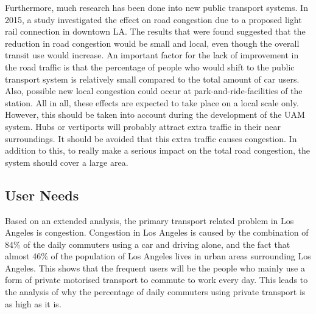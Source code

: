 Furthermore, much research has been done into new public transport systems. In 2015, a study \cite{lightrail} investigated the effect on road congestion due to a proposed light rail connection in downtown LA. The results that were found suggested that the reduction in road congestion would be small and local, even though the overall transit use would increase. An important factor for the lack of improvement in the road traffic is that the percentage of people who would shift to the public transport system is relatively small compared to the total amount of car users. Also, possible new local congestion could occur at park-and-ride-facilities of the station. All in all, these effects are expected to take place on a local scale only. However, this should be taken into account during the development of the UAM system. Hubs or vertiports will probably attract extra traffic in their near surroundings. It should be avoided that this extra traffic causes congestion. In addition to this, to really make a serious impact on the total road congestion, the system should cover a large area. 

\subsection{User Needs}
\label{needs}
Based on an extended analysis, the primary transport related problem in Los Angeles is congestion. Congestion in Los Angeles is caused by the combination of 84\% of the daily commuters using a car and driving alone, and the fact that almost 46\% of the population of Los Angeles lives in urban areas surrounding Los Angeles. This shows that the frequent users will be the people who mainly use a form of private motorised transport to commute to work every day. This leads to the analysis of why the percentage of daily commuters using private transport is as high as it is. 

